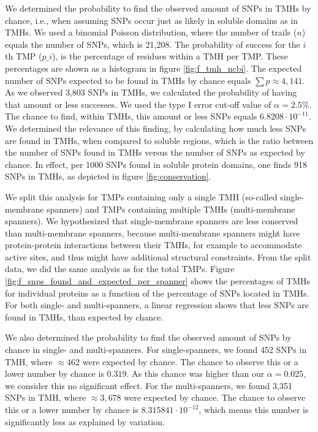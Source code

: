 We determined the probability to find the observed amount
of SNPs in TMHs by chance, i.e., when assuming SNPs occur 
just as likely in soluble domains as in TMHs.
We used a binomial Poisson distribution, 
where the number of trails ($n$) equals the number of SNPs, 
which is 21,208. 
The probability of success for the $i$th TMP ($p\_i$), 
is the percentage of residues within a TMH per TMP. 
These percentages are shown as a histogram 
in figure \ref{fig:f_tmh_ncbi}. 
The expected number of SNPs expected to be found in 
TMHs by chance equals $\sum{p} \approx 4,141$.
As we observed 3,803 SNPs in TMHs, 
we calculated the probability of having that amount or less successes.
We used the type I error cut-off value of $\alpha = 2.5\%$.
The chance to find, within TMHs, this amount or less SNPs 
equals $6.8208 \cdot 10^{-11}$.
We determined the relevance of this finding, by
calculating how much less SNPs are found in TMHs,
when compared to soluble regions, which is the
ratio between the number of SNPs found in TMHs
versus the number of SNPs as expected by chance.
In effect, per 1000 SNPs found in soluble protein domains, 
one finds 918 SNPs in TMHs,
as depicted in figure \ref{fig:conservation}. 

We split this analysis for TMPs containing only a single TMH (so-called single-membrane spanners) and TMPs containing multiple TMHs (multi-membrane spanners). 
We hypothesized that single-membrane spanners are less conserved than multi-membrane spanners,
because multi-membrane spanners
might have protein-protein interactions between their TMHs, 
for example to accommodate active sites, and 
thus might have additional structural constraints.
From the split data, we did the same analysis as for the total TMPs.
Figure \ref{fig:f_snps_found_and_expected_per_spanner} 
shows the percentages of TMHs for individual proteins as a function of the
percentage of SNPs located in TMHs.
For both single- and multi-spanners, a linear regression shows that less
SNPs are found in TMHs, than expected by chance.

We also determined the probability to find the 
observed amount of SNPs  by chance in single- and multi-spanners.
For single-spanners, we found 452 SNPs in TMH, where
$\approx462$ were expected by chance. 
The chance to observe this or a lower number by chance is 
$0.319$. As this chance was higher than our $\alpha = 0.025$,
we consider this no significant effect.
For the multi-spanners, we found 3,351 SNPs in TMH, where 
$\approx3,678$ were expected by chance. 
The chance to observe this or a lower number by chance is 
$8.315841 \cdot 10^{-12}$, 
which means this number is significantly less as explained by variation. 

